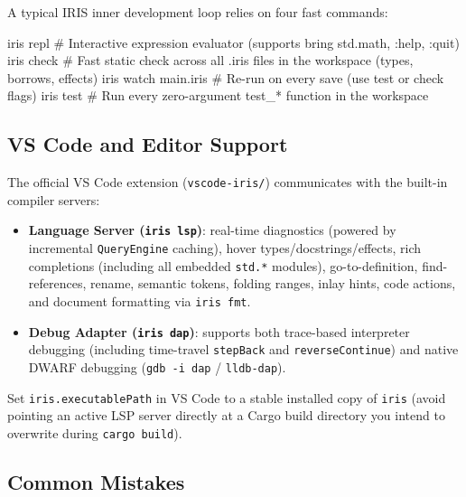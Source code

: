 \documentclass[
  english,
  oneside]{book}
\newenvironment{Shaded}{\begin{snugshade}}{\end{snugshade}}
\newcommand{\NormalTok}[1]{\textcolor[rgb]{0.83,0.83,0.83}{#1}}
\providecommand{\tightlist}{%
  \setlength{\itemsep}{0pt}\setlength{\parskip}{0pt}}
\begin{document}
A typical IRIS inner development loop relies on four fast commands:

\begin{Shaded}
\begin{Highlighting}[]
\NormalTok{iris repl                   \# Interactive expression evaluator (supports \textasciigrave{}bring std.math\textasciigrave{}, \textasciigrave{}:help\textasciigrave{}, \textasciigrave{}:quit\textasciigrave{})}
\NormalTok{iris check                  \# Fast static check across all .iris files in the workspace (types, borrows, effects)}
\NormalTok{iris watch main.iris        \# Re{-}run on every save (use \textasciigrave{}{-}{-}test\textasciigrave{} or \textasciigrave{}{-}{-}check\textasciigrave{} flags)}
\NormalTok{iris test                   \# Run every zero{-}argument \textasciigrave{}test\_*\textasciigrave{} function in the workspace}
\end{Highlighting}
\end{Shaded}

\subsection{VS Code and Editor
Support}\label{vs-code-and-editor-support}

The official VS Code extension (\texttt{vscode-iris/}) communicates with
the built-in compiler servers:

\begin{itemize}
\tightlist
\item
  \textbf{Language Server (\texttt{iris\ lsp})}: real-time diagnostics
  (powered by incremental \texttt{QueryEngine} caching), hover
  types/docstrings/effects, rich completions (including all embedded
  \texttt{std.*} modules), go-to-definition, find-references, rename,
  semantic tokens, folding ranges, inlay hints, code actions, and
  document formatting via \texttt{iris\ fmt}.
\item
  \textbf{Debug Adapter (\texttt{iris\ dap})}: supports both trace-based
  interpreter debugging (including time-travel \texttt{stepBack} and
  \texttt{reverseContinue}) and native DWARF debugging
  (\texttt{gdb\ -i\ dap} / \texttt{lldb-dap}).
\end{itemize}

Set \texttt{iris.executablePath} in VS Code to a stable installed copy
of \texttt{iris} (avoid pointing an active LSP server directly at a
Cargo build directory you intend to overwrite during
\texttt{cargo\ build}).

\subsection{Common Mistakes}\label{common-mistakes}
\end{document}
